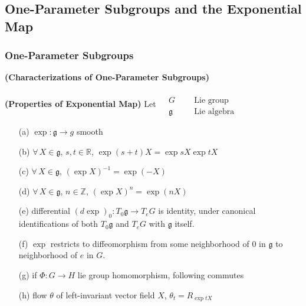 \subsection{One-Parameter Subgroups and the Exponential Map}

\subsubsection{One-Parameter Subgroups}

\begin{theorem}[20.1]\textbf{(Characterizations of One-Parameter Subgroups)}
\end{theorem}


\begin{proposition}[20.8] \textbf{(Properties of Exponential Map)} Let $\begin{aligned} & \quad \\ 
    & G \quad \, & \text{ Lie group } \\
    & \mathfrak{g} \quad \, & \text{ Lie algebra } \end{aligned}$

\begin{enumerate}
\item[(a)] $\exp: \mathfrak{g} \to g$ smooth
\item[(b)] $\forall \, X \in \mathfrak{g}$, $s,t\in \mathbb{R}$, $\exp{(s+t)}X = \exp{sX}\exp{tX}$
\item[(c)] $\forall \, X \in \mathfrak{g}$, $(\exp{X})^{-1} = \exp{(-X)}$
\item[(d)] $\forall \, X \in \mathfrak{g}$, $n\in \mathbb{Z}$, $(\exp{X})^n = \exp{(nX)}$
\item[(e)] differential $(d\exp)_0:T_0\mathfrak{g} \to T_eG$ is identity, under canonical identifications of both $T_0\mathfrak{g}$ and $T_eG$ with $\mathfrak{g}$ itself.
\item[(f)] $\exp$ restricts to diffeomorphism from some neighborhood of $0$ in $\mathfrak{g}$ to neighborhood of $e$ in $G$.  
\item[(g)] if $\Phi:G\to H$ lie group homomorphism, following commutes




\item[(h)] flow $\theta$ of left-invariant vector field $X$, $\theta_t = R_{\exp{tX}}$
\end{enumerate}
\end{proposition}

